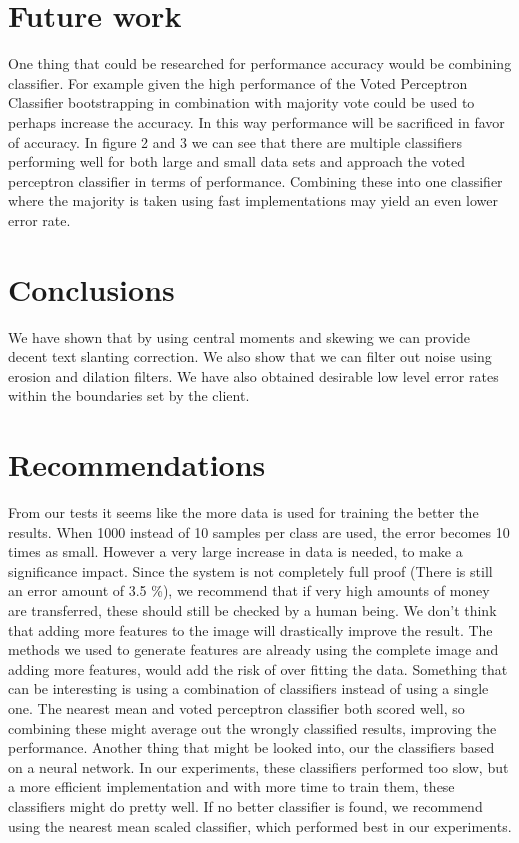 \documentclass[%
        compressed,
        final,
        notitlepage,
        narroweqnarray,
        inline,
        twoside,
        ]{ieee}
\begin{document}
\section{Future work}
One thing that could be researched for performance accuracy would be combining
classifier. For example given the high performance of the Voted Perceptron
Classifier bootstrapping in combination with majority vote could be used to
perhaps increase the accuracy. In this way performance will be sacrificed in
favor of accuracy. In figure 2 and 3 we can see that there are multiple
classifiers performing well for both large and small data sets and approach the
voted perceptron classifier in terms of performance. Combining these into one
classifier where the majority is taken using fast implementations may yield an
even lower error rate. %

\section{Conclusions}
We have shown that by using central moments and skewing we can provide decent
text slanting correction. We also show that we can filter out noise using
erosion and dilation filters. We have also obtained desirable low level error
rates within the boundaries set by the client.

\section{Recommendations}
From our tests it seems like the more data is used for training the better the
results. When 1000 instead of 10 samples per class are used, the error becomes
10 times as small. However a very large increase in data is needed, to make a
significance impact.  Since the system is not completely full proof (There is
still an error amount of 3.5 \%), we recommend that if very high amounts of
money are transferred, these should still be checked by a human being.
We don't think that adding more features to the image will drastically improve
the result. The methods we used to generate features are already using the
complete image and adding more features, would add the risk of over fitting the
data.
Something that can be interesting is using a combination of classifiers instead
of using a single one.  The nearest mean and voted perceptron classifier both
scored well, so combining these might average out the wrongly classified
results, improving the performance.
Another thing that might be looked into, our the classifiers based on a neural
network. In our experiments, these classifiers performed too slow, but a more
efficient implementation and with more time to train them, these classifiers
might do pretty well.
If no better classifier is found, we recommend using the nearest mean scaled
classifier, which performed best in our experiments.

\end{document}
